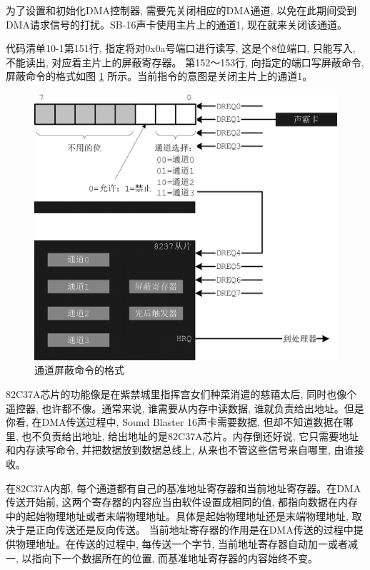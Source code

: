 \documentclass[12pt]{article}
\begin{document}
\begin{CJK}{UTF8}{gbsn}
为了设置和初始化DMA控制器, 需要先关闭相应的DMA通道, 以免在此期间受到DMA请求信号的打扰。SB-16声卡使用主片上的通道1, 现在就来关闭该通道。

代码清单10-1第151行, 指定将对0x0a号端口进行读写, 这是个8位端口, 只能写入, 不能读出, 对应着主片上的屏蔽寄存器。
第152～153行, 向指定的端口写屏蔽命令, 屏蔽命令的格式如图 \ref{named} 所示。当前指令的意图是关闭主片上的通道1。
 
\begin{figure}
\begin{center}
\includegraphics[width=\textwidth]{eps/10-7.bmp.eps}
\caption{通道屏蔽命令的格式}\label{named}
\end{center}
\end{figure}

82C37A芯片的功能像是在紫禁城里指挥宫女们种菜消遣的慈禧太后, 同时也像个遥控器, 也许都不像。通常来说, 谁需要从内存中读数据, 谁就负责给出地址。但是你看, 在DMA传送过程中, Sound Blaster 16声卡需要数据, 但却不知道数据在哪里, 也不负责给出地址, 给出地址的是82C37A芯片。内存倒还好说, 它只需要地址和内存读写命令, 并把数据放到数据总线上, 从来也不管这些信号来自哪里, 由谁接收。

在82C37A内部, 每个通道都有自己的基准地址寄存器和当前地址寄存器。在DMA传送开始前, 这两个寄存器的内容应当由软件设置成相同的值, 都指向数据在内存中的起始物理地址或者末端物理地址。具体是起始物理地址还是末端物理地址, 取决于是正向传送还是反向传送。
当前地址寄存器的作用是在DMA传送的过程中提供物理地址。在传送的过程中, 每传送一个字节, 当前地址寄存器自动加一或者减一, 以指向下一个数据所在的位置, 而基准地址寄存器的内容始终不变。


\end{CJK}
\end{document}

